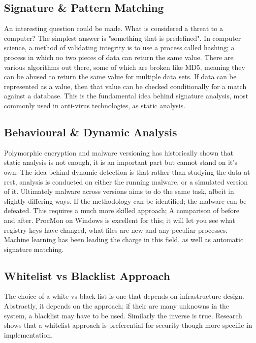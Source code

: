 \subsection{Signature \& Pattern Matching}
An interesting question could be made. What is considered a threat to a computer? The simplest answer is "something that is predefined". 
In computer science, a method of validating integrity is to use a process called hashing; a process in which no two pieces of data can return the same value. 
There are various algorithms out there, some of which are broken like MD5, meaning they can be abused to return the same value for multiple data sets. 
If data can be represented as a value, then that value can be checked conditionally for a match against a database. This is the fundamental idea behind signature analysis,
most commonly used in anti-virus technologies, as static analysis.


\subsection{Behavioural & Dynamic Analysis}
Polymorphic encryption and malware versioning has historically shown that static analysis is not enough, it is an important part but cannot stand on it's own. The idea behind dynamic detection is that rather than
studying the data at rest, analysis is conducted on either the running malware, or a simulated version of it. Ultimately malware across versions aims to do the same task, albeit in slightly differing ways. If the methodology
can be identified; the malware can be defeated. This requires a much more skilled approach; A comparison of before and after. ProcMon on Windows is excellent for this; it will let you see what registry keys have changed, what files are new and any peculiar processes.
Machine learning has been leading the charge in this field, as well as automatic signature matching.


\subsection{Whitelist vs Blacklist Approach}
The choice of a white vs black list is one that depends on infrastructure design. Abstractly, it depends on the approach; if their are many unknowns in the system, a blacklist may have to be used. 
Similarly the inverse is true. Research shows that a whitelist approach is preferential for security though more specific in implementation. 

